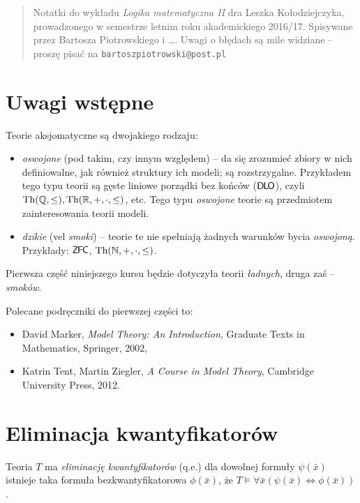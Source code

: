 \documentclass{article}
\begin{document}
\begin{abstract}
	Notatki do wykładu \textit{Logika matematyczna II} dra Leszka Kołodziejczyka, prowadzonego w semestrze letnim roku akademickiego 2016/17.
	Spisywane przez Bartosza Piotrowskiego i \ldots.
	Uwagi o błędach są mile widziane -- proszę pisać na \texttt{bartoszpiotrowski@post.pl}
\end{abstract}


\section*{Uwagi wstępne}
Teorie aksjomatyczne są dwojakiego rodzaju:
\begin{itemize} %
	\item \textit{oswojone} (pod takim, czy innym względem) -- da się zrozumieć zbiory w nich definiowalne, jak również struktury ich modeli; są rozstrzygalne.
		Przykładem tego typu teorii są gęste liniowe porządki bez końców ($\mathsf{D \mkern-1.5mu L \mkern-1.8mu O}$), czyli $\text{Th}(\mathbb{Q}, \leq), \text{Th}(\mathbb{R}, +, \cdot, \leq)$, etc.
		Tego typu \textit{oswojone} teorie są przedmiotem zainteresowania teorii modeli.
	\item \textit{dzikie} (vel \textit{smoki}) -- teorie te nie spełniają żadnych warunków bycia \textit{oswojoną}.
		Przykłady: $\mathsf{Z \mkern-1.6mu F \mkern-1.5mu C}$, $\text{Th}(\mathbb{N}, +, \cdot, \leq)$.
\end{itemize}
Pierwsza część niniejszego kursu będzie dotyczyła teorii \textit{ładnych}, druga zaś -- \textit{smoków}.

Polecane podręczniki do pierwszej części to:
\begin{itemize}
	\item David Marker, \textit{Model Theory: An Introduction}, Graduate Texts in Mathematics, Springer, 2002,
	\item Katrin Tent, Martin Ziegler, \textit{A Course in Model Theory}, Cambridge University Press, 2012.
\end{itemize}


\section{Eliminacja kwantyfikatorów}
\begin{df}
	Teoria $T$ ma \textit{eliminację kwantyfikatorów} (q.e.) \wtw dla dowolnej formuły $\psi(\bar{x})$ istnieje taka formuła bezkwantyfikatorowa $\phi(\bar{x})$, że $T \models \forall {\bar{x}} (\psi(\bar{x}) \iff \phi(\bar{x}))$.
\end{df}
\end{document}
